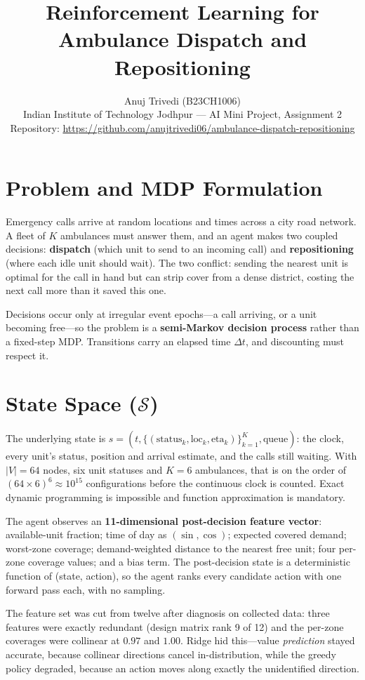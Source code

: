\documentclass[10pt,twocolumn,a4paper]{article}
\title{\vspace{-8mm}\textbf{Reinforcement Learning for Ambulance Dispatch and
Repositioning}}
\author{Anuj Trivedi (B23CH1006)\\
\small Indian Institute of Technology Jodhpur --- AI Mini Project, Assignment 2\\
\small Repository: \url{https://github.com/anujtrivedi06/ambulance-dispatch-repositioning}}
\date{}
\begin{document}
\twocolumn[{\maketitle}]

\section{Problem and MDP Formulation}
Emergency calls arrive at random locations and times across a city road network. A fleet
of $K$ ambulances must answer them, and an agent makes two coupled decisions:
\textbf{dispatch} (which unit to send to an incoming call) and \textbf{repositioning}
(where each idle unit should wait). The two conflict: sending the nearest unit is optimal
for the call in hand but can strip cover from a dense district, costing the next call more
than it saved this one.

Decisions occur only at irregular event epochs---a call arriving, or a unit becoming
free---so the problem is a \textbf{semi-Markov decision process} rather than a fixed-step
MDP. Transitions carry an elapsed time $\Delta t$, and discounting must respect it.

\section{State Space ($\mathcal{S}$)}
The underlying state is $s = (t, \{(\text{status}_k, \text{loc}_k,
\text{eta}_k)\}_{k=1}^{K}, \text{queue})$: the clock, every unit's status, position and
arrival estimate, and the calls still waiting. With $|V| = 64$ nodes, six unit statuses
and $K = 6$ ambulances, that is on the order of $(64 \times 6)^6 \approx 10^{15}$
configurations before the continuous clock is counted. Exact dynamic programming is
impossible and function approximation is mandatory.

The agent observes an \textbf{11-dimensional post-decision feature vector}: available-unit
fraction; time of day as $(\sin, \cos)$; expected covered demand; worst-zone coverage;
demand-weighted distance to the nearest free unit; four per-zone coverage values; and a
bias term. The post-decision state is a deterministic function of (state, action), so the
agent ranks every candidate action with one forward pass each, with no sampling.

The feature set was cut from twelve after diagnosis on collected data: three features were
exactly redundant (design matrix rank 9 of 12) and the per-zone coverages were collinear
at $0.97$ and $1.00$. Ridge hid this---value \emph{prediction} stayed accurate, because
collinear directions cancel in-distribution, while the greedy policy degraded, because an
action moves along exactly the unidentified direction.
\end{document}
